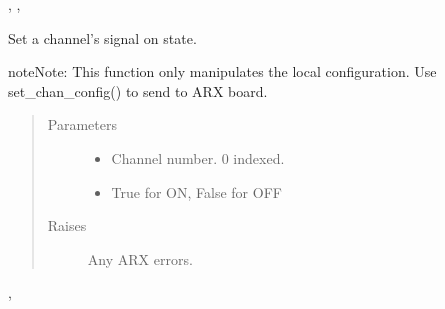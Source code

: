 \documentclass[letterpaper,10pt,english]{sphinxmanual}
\begin{document}
\begin{fulllineitems}
\begin{fulllineitems}


{\hyperref[\detokenize{index:lwautils.lwa_arx.ARX.show_chan_cfg}]{}}, {\hyperref[\detokenize{index:lwautils.lwa_arx.ARX.set_chan_cfg}]{}}, 



\end{fulllineitems}


\begin{fulllineitems}
\label{\detokenize{index:lwautils.lwa_arx.ARX.set_chan_cfg_signal_on_state}}
Set a channel’s signal on state.

\begin{sphinxadmonition}{note}{Note:}
This function only manipulates the local configuration.
Use set\_chan\_config() to send to ARX board.
\end{sphinxadmonition}
\begin{quote}\begin{description}
\item[{Parameters}] \leavevmode\begin{itemize}
\item {} 
 \textendash{} Channel number. 0 indexed.

\item {} 
 \textendash{} True for ON, False for OFF

\end{itemize}

\item[{Raises}] \leavevmode
{} \textendash{} Any ARX errors.

\end{description}\end{quote}




{\hyperref[\detokenize{index:lwautils.lwa_arx.ARX.show_chan_cfg}]{}}, {\hyperref[\detokenize{index:lwautils.lwa_arx.ARX.set_chan_cfg}]{}}




\end{fulllineitems}
\end{fulllineitems}
\end{document}
